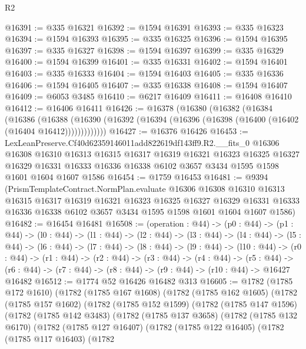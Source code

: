 \begin{lexlean}{R2}
\begin{coremodule}
@16391 := @335 @16321
@16392 := @1594 @16391
@16393 := @335 @16323
@16394 := @1594 @16393
@16395 := @335 @16325
@16396 := @1594 @16395
@16397 := @335 @16327
@16398 := @1594 @16397
@16399 := @335 @16329
@16400 := @1594 @16399
@16401 := @335 @16331
@16402 := @1594 @16401
@16403 := @335 @16333
@16404 := @1594 @16403
@16405 := @335 @16336
@16406 := @1594 @16405
@16407 := @335 @16338
@16408 := @1594 @16407
@16409 := @6053 @3485
@16410 := @6217 @16409
@16411 := @16408 @16410
@16412 := @16406 @16411
@16426 := @16378
    (@16380
      (@16382
        (@16384
          (@16386
            (@16388
              (@16390 (@16392 (@16394 (@16396 (@16398 (@16400 (@16402 (@16404 @16412)))))))))))))
@16427 := @16376 @16426
@16453 := LexLeanPreserve.Cf40d62359146011add822619df143ff9.R2.__fits_0
    @16306
    @16308
    @16310
    @16313
    @16315
    @16317
    @16319
    @16321
    @16323
    @16325
    @16327
    @16329
    @16331
    @16333
    @16336
    @16338
    @6102
    @3657
    @3434
    @1595
    @1598
    @1601
    @1604
    @1607
    @1586
@16454 := @1759 @16453
@16481 := @9394
    (PrismTemplateContract.NormPlan.evaluate
      @16306
      @16308
      @16310
      @16313
      @16315
      @16317
      @16319
      @16321
      @16323
      @16325
      @16327
      @16329
      @16331
      @16333
      @16336
      @16338
      @6102
      @3657
      @3434
      @1595
      @1598
      @1601
      @1604
      @1607
      @1586)
@16482 := @16454 @16481
@16508 := (operation : @44) ->
  (p0 : @44) ->
  (p1 : @44) ->
  (l0 : @44) ->
  (l1 : @44) ->
  (l2 : @44) ->
  (l3 : @44) ->
  (l4 : @44) ->
  (l5 : @44) ->
  (l6 : @44) ->
  (l7 : @44) ->
  (l8 : @44) ->
  (l9 : @44) ->
  (l10 : @44) ->
  (r0 : @44) ->
  (r1 : @44) ->
  (r2 : @44) ->
  (r3 : @44) ->
  (r4 : @44) ->
  (r5 : @44) -> (r6 : @44) -> (r7 : @44) -> (r8 : @44) -> (r9 : @44) -> (r10 : @44) -> @16427 @16482
@16512 := @1774 @52 @16426 @16482 @313
@16605 := @1782
    (@1785 @172 @1610)
    (@1782
      (@1785 @167 @1608)
      (@1782
        (@1785 @162 @1605)
        (@1782
          (@1785 @157 @1602)
          (@1782
            (@1785 @152 @1599)
            (@1782
              (@1785 @147 @1596)
              (@1782
                (@1785 @142 @3483)
                (@1782
                  (@1785 @137 @3658)
                  (@1782
                    (@1785 @132 @6170)
                    (@1782
                      (@1785 @127 @16407)
                      (@1782
                        (@1785 @122 @16405)
                        (@1782
                          (@1785 @117 @16403)
                          (@1782

\end{coremodule}
\end{lexlean}
